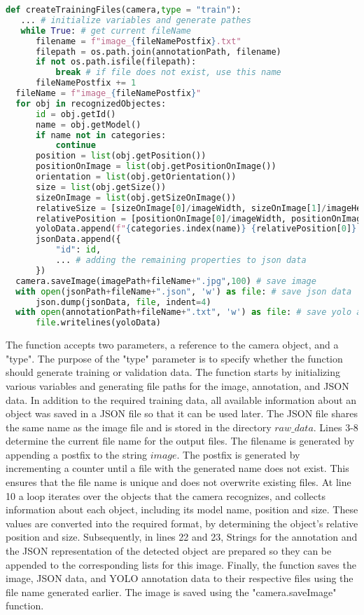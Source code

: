 \begin{lstlisting}[language=python]
def createTrainingFiles(camera,type = "train"):
   ... # initialize variables and generate pathes
   while True: # get current fileName
      filename = f"image_{fileNamePostfix}.txt"
      filepath = os.path.join(annotationPath, filename)
      if not os.path.isfile(filepath): 
          break # if file does not exist, use this name
      fileNamePostfix += 1
  fileName = f"image_{fileNamePostfix}"
  for obj in recognizedObjectes:
      id = obj.getId()
      name = obj.getModel()
      if name not in categories:
          continue
      position = list(obj.getPosition())
      positionOnImage = list(obj.getPositionOnImage())
      orientation = list(obj.getOrientation())
      size = list(obj.getSize())
      sizeOnImage = list(obj.getSizeOnImage())
      relativeSize = [sizeOnImage[0]/imageWidth, sizeOnImage[1]/imageHeight]
      relativePosition = [positionOnImage[0]/imageWidth, positionOnImage[1]/imageHeight]
      yoloData.append(f"{categories.index(name)} {relativePosition[0]} {relativePosition[1]} {relativeSize[0]} {relativeSize[1]}\n")
      jsonData.append({
          "id": id,
          ... # adding the remaining properties to json data
      })
  camera.saveImage(imagePath+fileName+".jpg",100) # save image
  with open(jsonPath+fileName+".json", 'w') as file: # save json data
      json.dump(jsonData, file, indent=4)   
  with open(annotationPath+fileName+".txt", 'w') as file: # save yolo annotation
      file.writelines(yoloData)
\end{lstlisting}
The function accepts two parameters, a reference to the camera object, and a "type". The purpose of the "type" parameter is to specify whether the function should generate training or validation data. The function starts by initializing various variables and generating file paths for the image, annotation, and JSON data. In addition to the required training data, all available information about an object was saved in a JSON file so that it can be used later. The JSON file shares the same name as the image file and is stored in the directory \(raw\_data\). Lines 3-8 determine the current file name for the output files. The filename is generated by appending a postfix to the string \(image\). The postfix is generated by incrementing a counter until a file with the generated name does not exist. This ensures that the file name is unique and does not overwrite existing files.
At line 10 a loop iterates over the objects that the camera recognizes, and collects information about each object, including its model name, position and size. These values are converted into the required format, by determining the object's relative position and size. Subsequently, in lines 22 and 23, Strings for the annotation and the JSON representation of the detected object are prepared so they can be appended to the corresponding lists for this image. Finally, the function saves the image, JSON data, and YOLO annotation data to their respective files using the file name generated earlier. The image is saved using the "camera.saveImage" function.

